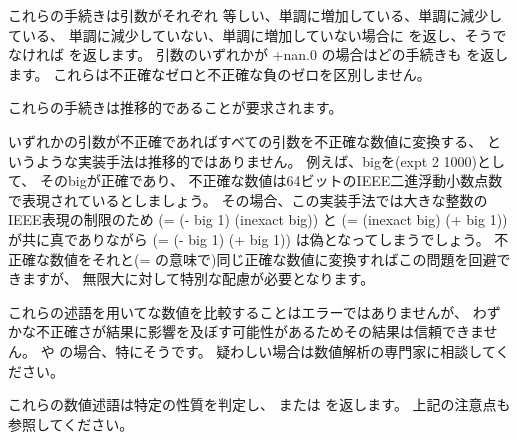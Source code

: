 \begin{entry}{%
}

これらの手続きは引数がそれぞれ
等しい、単調に増加している、単調に減少している、
単調に減少していない、単調に増加していない場合に %
\schtrue{}を返し、そうでなければ \schfalse{}を返します。
引数のいずれかが {\cf +nan.0} の場合はどの手続きも \schfalse{}を返します。
これらは不正確なゼロと不正確な負のゼロを区別しません。

これらの手続きは推移的であることが要求されます。

\begin{note}
いずれかの引数が不正確であればすべての引数を不正確な数値に変換する、
というような実装手法は推移的ではありません。
例えば、{\cf big}を{\cf (expt 2 1000)}として、
その{\cf big}が正確であり、
不正確な数値は64ビットのIEEE二進浮動小数点数で表現されているとしましょう。
その場合、この実装手法では大きな整数のIEEE表現の制限のため
{\cf (= (- big 1) (inexact big))} と {\cf (= (inexact big) (+ big 1))} が共に真でありながら
{\cf (= (- big 1) (+ big 1))} は偽となってしまうでしょう。
不正確な数値をそれと({\cf =} の意味で)同じ正確な数値に変換すればこの問題を回避できますが、
無限大に対して特別な配慮が必要となります。
\end{note}

\begin{note}
これらの述語を用いてな数値を比較することはエラーではありませんが、
わずかな不正確さが結果に影響を及ぼす可能性があるためその結果は信頼できません。
\ide{=} や の場合、特にそうです。
疑わしい場合は数値解析の専門家に相談してください。

\end{note}

\end{entry}

\begin{entry}{%
}

これらの数値述語は特定の性質を判定し、\schtrue{} または \schfalse を返します。
上記の注意点も参照してください。

\end{entry}

